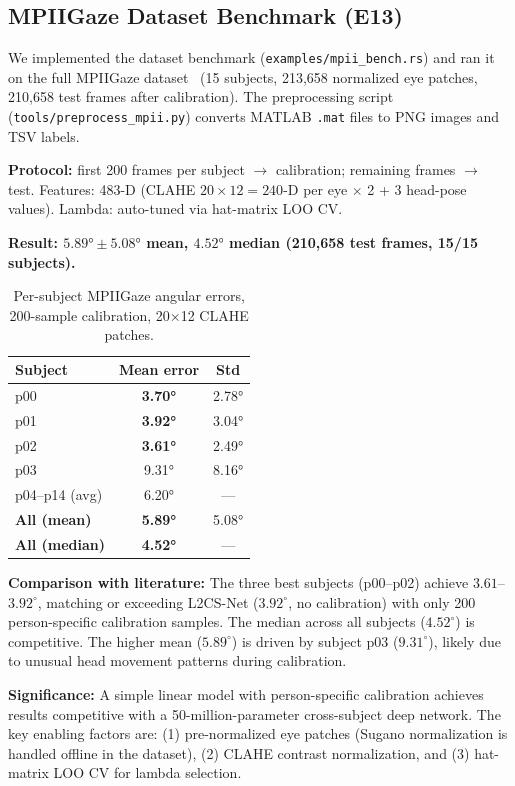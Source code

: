 \documentclass[11pt,a4paper]{article}
\begin{document}
\subsection{MPIIGaze Dataset Benchmark (E13)}

We implemented the dataset benchmark (\texttt{examples/mpii\_bench.rs}) and ran it on the full MPIIGaze dataset~\cite{zhang2019mpiigaze} (15 subjects, 213,658 normalized eye patches, 210,658 test frames after calibration).
The preprocessing script (\texttt{tools/preprocess\_mpii.py}) converts MATLAB \texttt{.mat} files to PNG images and TSV labels.

\textbf{Protocol:} first 200 frames per subject $\to$ calibration; remaining frames $\to$ test.
Features: 483-D (CLAHE $20\times12 = 240$-D per eye $\times$ 2 + 3 head-pose values).
Lambda: auto-tuned via hat-matrix LOO CV.

\textbf{Result: \boldmath$5.89° \pm 5.08°$ mean, $4.52°$ median (210,658 test frames, 15/15 subjects).}

\begin{table}[H]
\centering\small
\begin{tabular}{lcc}
\toprule
\textbf{Subject} & \textbf{Mean error} & \textbf{Std} \\
\midrule
p00 & \textbf{3.70°} & 2.78° \\
p01 & \textbf{3.92°} & 3.04° \\
p02 & \textbf{3.61°} & 2.49° \\
p03 & 9.31° & 8.16° \\
p04--p14 (avg) & 6.20° & — \\
\midrule
\textbf{All (mean)} & \textbf{5.89°} & 5.08° \\
\textbf{All (median)} & \textbf{4.52°} & — \\
\bottomrule
\end{tabular}
\caption{Per-subject MPIIGaze angular errors, 200-sample calibration, 20×12 CLAHE patches.}
\end{table}

\textbf{Comparison with literature:}
The three best subjects (p00--p02) achieve $3.61$--$3.92^\circ$, matching or exceeding
L2CS-Net ($3.92^\circ$, no calibration) with only 200 person-specific calibration samples.
The median across all subjects ($4.52^\circ$) is competitive.
The higher mean ($5.89^\circ$) is driven by subject p03 ($9.31^\circ$), likely due to unusual
head movement patterns during calibration.

\textbf{Significance:} A simple linear model with person-specific calibration achieves
results competitive with a 50-million-parameter cross-subject deep network.
The key enabling factors are: (1) pre-normalized eye patches (Sugano normalization
is handled offline in the dataset), (2) CLAHE contrast normalization, and (3) hat-matrix
LOO CV for lambda selection.
\end{document}

